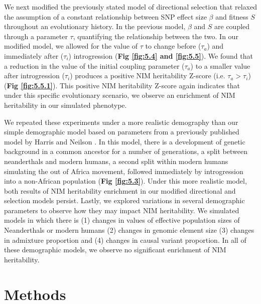We next modified the previously stated model of directional selection that relaxed the assumption of a constant relationship between SNP effect size $\beta$ and fitness $S$ throughout an evolutionary history. In the previous model, $\beta$ and $S$ are coupled through a parameter $\tau$, quantifying the relationship between the two. In our modified model, we allowed for the value of $\tau$ to change before ($\tau_a$) and immediately after ($\tau_i$) introgression (\textbf{Fig \ref{fig:5.4} and \ref{fig:5.5}}). We found that a reduction in the value of the initial coupling parameter ($\tau_a$) to a smaller value after introgression ($\tau_i$) produces a positive NIM heritability Z-score (i.e. $\tau_a > \tau_i$) (\textbf{Fig \ref{fig:5.5.1}}). This positive NIM heritability Z-score again indicates that under this specific evolutionary scenario, we observe an enrichment of NIM heritability in our simulated phenotype.

We repeated these experiments under a more realistic demography than our simple demographic model based on parameters from a previously published model by Harris and Neilson \cite{harris2016genetic}. In this model, there is a development of genetic background in a common ancestor for a number of generations, a split between neanderthals and modern humans, a second split within modern humans simulating the out of Africa movement, followed immediately by introgression into a non-African population (\textbf{Fig \ref{fig:5.3}}). Under this more realistic model, both results of NIM heritability enrichment in our modified directional and selection models persist. Lastly, we explored variations in several demographic parameters to observe how they may impact NIM heritability. We simulated models in which there is (1) changes in values of effective population sizes of Neanderthals or modern humans (2) changes in genomic element size (3) changes in admixture proportion and (4) changes in causal variant proportion. In all of these demographic models, we observe no significant enrichment of NIM heritability. 

\section{Methods}
